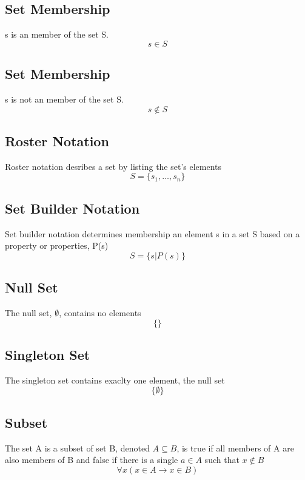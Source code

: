 \documentclass[12pt]{article}
\begin{document}
\subsection{Set Membership}
s is an member of the set S.
\begin{equation}
s \in S
\end{equation}

\subsection{Set Membership}
s is not an member of the set S.
\begin{equation}
s \not \in S
\end{equation}

\subsection{Roster Notation}
Roster notation desribes a set by listing the set's elements
\begin{equation}
S = \{s_1, \ldots, s_n\}
\end{equation}

\subsection{Set Builder Notation}
Set builder notation determines membership an element s in a set S based on a property or properties, P(s)
\begin{equation}
S = \{s | P(s)\}
\end{equation}

\subsection{Null Set}
The null set, $\emptyset$, contains no elements
\begin{equation}
\{ \}
\end{equation}

\subsection{Singleton Set}
The singleton set contains exaclty one element, the null set
\begin{equation}
\{ \emptyset\}
\end{equation}

\subsection{Subset}
The set A is a subset of set B, denoted $A \subseteq B$,
is true 
if all members of A are also members of B
and false 
if there is a single $a \in A$ such that $x \not \in B$
\begin{equation}
\forall x (x \in A \rightarrow x \in B)
\end{equation}
\end{document}
